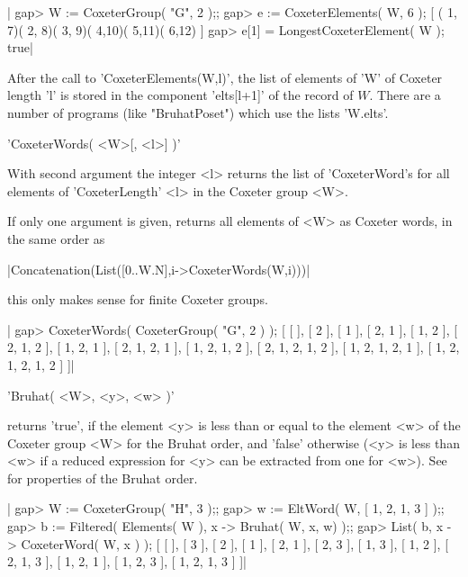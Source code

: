 |    gap> W := CoxeterGroup( "G", 2 );;
    gap> e := CoxeterElements( W, 6 );
    [ ( 1, 7)( 2, 8)( 3, 9)( 4,10)( 5,11)( 6,12) ]
    gap> e[1] = LongestCoxeterElement( W );
    true|

After  the call to  'CoxeterElements(W,l)', the list  of elements of 'W' of
Coxeter  length 'l' is stored in the component 'elts[l+1]' of the record of
$W$.  There are  a number  of programs  (like "BruhatPoset")  which use the
lists 'W.elts'.


'CoxeterWords( <W>[, <l>] )'

With second argument the integer <l> returns the list of 'CoxeterWord's for
all elements of 'CoxeterLength' <l> in the Coxeter group <W>.

If  only one  argument is  given, returns  all elements  of <W>  as Coxeter
words, in the same order as

|Concatenation(List([0..W.N],i->CoxeterWords(W,i)))|

this only makes sense for finite Coxeter groups.

|    gap> CoxeterWords( CoxeterGroup( "G", 2 ) );
    [ [  ], [ 2 ], [ 1 ], [ 2, 1 ], [ 1, 2 ], [ 2, 1, 2 ], [ 1, 2, 1 ],
      [ 2, 1, 2, 1 ], [ 1, 2, 1, 2 ], [ 2, 1, 2, 1, 2 ],
      [ 1, 2, 1, 2, 1 ], [ 1, 2, 1, 2, 1, 2 ] ]|


'Bruhat( <W>, <y>, <w> )'

returns 'true', if the element <y> is less than or equal to the element <w>
of  the Coxeter group <W> for the  Bruhat order, and 'false' otherwise (<y>
is  less than <w> if a reduced expression for <y> can be extracted from one
for  <w>). See \cite[(5.9) and (5.10)]{Hum90}  for properties of the Bruhat
order.

|    gap> W := CoxeterGroup( "H", 3 );;
    gap> w := EltWord( W, [ 1, 2, 1, 3 ] );;
    gap> b := Filtered( Elements( W ), x -> Bruhat( W, x, w) );;
    gap> List( b, x -> CoxeterWord( W, x ) );
    [ [  ], [ 3 ], [ 2 ], [ 1 ], [ 2, 1 ], [ 2, 3 ], [ 1, 3 ], [ 1, 2 ],
      [ 2, 1, 3 ], [ 1, 2, 1 ], [ 1, 2, 3 ], [ 1, 2, 1, 3 ] ]|


